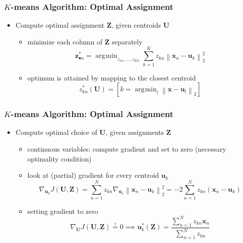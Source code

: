 \documentclass[conference,11pt]{IEEEtran}
\DeclareMathOperator*{\argmin}{\arg\!\min}
\newcommand{\iver}[1]{\left[#1\right]}
\newcommand{\norm}[1]{\left\lVert#1\right\rVert}
\newcommand{\matr}[1]{\boldsymbol{\mathbf{#1}}}
\newcommand{\vect}[1]{\boldsymbol{\mathbf{#1}}}
\begin{document}
\subsubsection{$K$-means Algorithm: Optimal Assignment}
\begin{itemize}
  \item Compute optimal assignment $\matr{Z}$, given centroids $\matr{U}$
    \begin{itemize}
      \item minimize each column of $\matr{Z}$ separately
        \[
          \vect{z}_{\bullet n}^* = \argmin_{z_{1n},\ldots,z_{Kn}} \sum_{k=1}^K
          z_{kn} \norm{\vect{x}_n - \vect{u}_k}_2^2
        \]
      \item optimum is attained by mapping to the closest centroid
        \[
          z_{kn}^*(\matr{U}) = \iver{k = \argmin_l \norm{\vect{x} - \vect{u}_l}_2}
        \]
    \end{itemize}
\end{itemize}

\subsubsection{$K$-means Algorithm: Optimal Assignment}
\begin{itemize}
  \item Compute optimal choice of $\matr{U}$, given assignments $\matr{Z}$
    \begin{itemize}
      \item continuous variables: compute gradient and set to zero (necessary
        optimality condition)
      \item look at (partial) gradient for every centroid $\vect{u}_k$
        \[
          \nabla_{\vect{u}_k} J(\matr{U},\matr{Z}) = \sum_{n=1}^N z_{kn}
          \nabla_{\vect{u}_k} \norm{\vect{x}_n - \vect{u}_k}_2^2 = -2
          \sum_{n=1}^N z_{kn} (\vect{x}_n - \vect{u}_k)
        \]
      \item setting gradient to zero
        \[
          \nabla_{\matr{U}} J(\matr{U},\matr{Z}) \stackrel{!}{=} 0 \implies
          \vect{u}_k^*(\matr{Z}) = \frac{\sum_{n=1}^N z_{kn} \vect{x}_n}
          {\sum_{n=1}^N z_{kn}} %
        \]
    \end{itemize}
\end{itemize}
\end{document}
